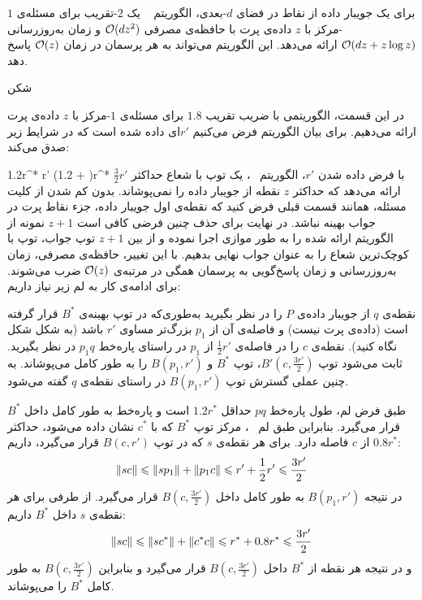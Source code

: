 برای یک جویبار داده از نقاط در فضای $d$-بعدی، الگوریتم ~ یک $2$-تقریب برای مسئله‌ی $1$-مرکز با $z$ داده‌ی پرت با حافظه‌ی مصرفی $\mathcal{O}(dz^2)$ و زمان به‌روزرسانی $\mathcal{O}(dz + z\log{z})$ ارائه می‌دهد.
این الگوریتم می‌تواند به هر پرسمان در زمان $\mathcal{O}(z)$ پاسخ دهد.

‌شکن


در این قسمت، الگوریتمی با ضریب تقریب $1.8$ برای مسئله‌ی $1$-مرکز با $z$ داده‌ی پرت ارائه می‌دهیم. برای بیان الگوریتم فرض می‌کنیم $r'$ای داده شده است که در شرایط زیر صدق می‌کند:

1.2r^* \leq r' \leq (1.2 + )r^*
با فرض داده شدن $r'$، الگوریتم ~، یک توپ با شعاع حداکثر $\frac{3}{2}r'$ ارائه می‌دهد که حداکثر $z$ نقطه از جویبار داده را نمی‌پوشاند.
بدون کم شدن از کلیت مسئله، همانند قسمت قبلی فرض کنید که نقطه‌ی اول جویبار داده، جزء نقاط پرت در جواب بهینه نباشد.
در نهایت برای حذف چنین فرضی کافی است $z+1$ نمونه از الگوریتم ارائه شده را به طور موازی اجرا نموده و از بین $z+1$ توپ جواب، توپ با کوچک‌ترین شعاع را به عنوان جواب نهایی بدهیم.
با این تغییر، حافظه‌ی مصرفی، زمان به‌روزرسانی و زمان پاسخ‌گویی به پرسمان همگی در مرتبه‌ی $\mathcal{O}(z)$ ضرب می‌شوند.
برای ادامه‌ی کار به لم زیر نیاز داریم:


نقطه‌ی $q$ از جویبار داده‌ی $P$ را در نظر بگیرید به‌طوری‌که در توپ بهینه‌ی $B^*$ قرار گرفته است (داده‌ی پرت نیست) و فاصله‌ی آن از $p_1$ بزرگ‌تر مساوی $r'$ باشد (به شکل شکل ~ نگاه کنید).
نقطه‌ی $c$ را در فاصله‌ی $\frac{1}{2}r'$ از $p_1$ در راستای پاره‌خط $p_1q$ در نظر بگیرید.
ثابت می‌شود توپ $B'(c, \frac{3r'}{2})$، توپ $B^*$ و $B(p_1, r')$ را به طور کامل می‌پوشاند.
به چنین عملی گسترش توپ $B(p_1, r')$ در راستای نقطه‌ی $q$ گفته می‌شود.


طبق فرض لم، طول پاره‌خط $pq$ حداقل $1.2r^*$ است و پاره‌خط به طور کامل داخل $B^*$ قرار می‌گیرد.
بنابراین طبق لم ~، مرکز توپ $B^*$ که با $c^*$ نشان داده می‌شود، حداکثر $0.8r^*$ از $c$ فاصله دارد. برای هر نقطه‌ی $s$ که در توپ $B(c, r')$ قرار می‌گیرد، داریم:
$$\|{sc}\| \leqslant \|{sp_1}\|  + \|{p_1c}\| \leqslant r' + \frac{1}{2}r' \leqslant \frac{3r'}{2}$$
در نتیجه $B(p_1, r')$ به طور کامل داخل $B(c, \frac{3r'}{2})$ قرار می‌گیرد. از طرفی برای هر نقطه‌ی $s$ داخل $B^*$  داریم:
$$\|{sc}\| \leqslant \|{sc^*}\|  + \|{c^*c}\| \leqslant r^* + 0.8r^* \leqslant \frac{3r'}{2}$$
و در نتیجه هر نقطه از $B^*$ داخل $B(c, \frac{3r'}{2})$ قرار می‌گیرد و بنابراین $B(c, \frac{3r'}{2})$ به طور کامل $B^*$ را می‌پوشاند. 


